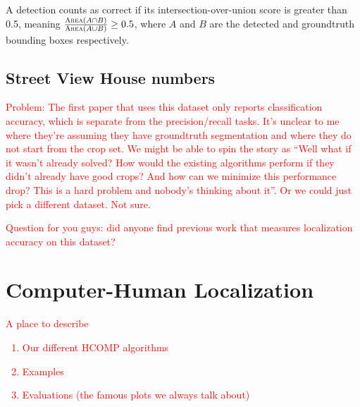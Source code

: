 \documentclass[10pt,twocolumn,letterpaper]{article}
\newcommand{\preliminary}[1]{\textcolor{red}{#1}}
\begin{document}
A detection counts as correct if its intersection-over-union score is greater than 0.5, meaning $\frac{\textsc{Area}(A \cap B)}{\textsc{Area}(A \cup B)} \geq 0.5$, where $A$ and $B$ are the detected and groundtruth bounding boxes respectively.

\subsection{Street View House numbers}
\cite{netzer2011reading}

\preliminary{Problem: The first paper that uses this dataset \cite{netzer2011reading} only reports classification accuracy, which is separate from the precision/recall tasks. It's unclear to me where they're assuming they have groundtruth segmentation and where they do not start from the crop set. We might be able to spin the story as ``Well what if it wasn't already solved? How would the existing algorithms perform if they didn't already have good crops? And how can we minimize this performance drop? This is a hard problem and nobody's thinking about it''. Or we could just pick a different dataset. Not sure.}

\preliminary{Question for you guys: did anyone find previous work that measures localization accuracy on this dataset?}

\section{Computer-Human Localization}
\preliminary{
A place to describe
\begin{enumerate}
\item Our different HCOMP algorithms
\item Examples
\item Evaluations (the famous plots we always talk about)
\end{enumerate}
}
\end{document}
